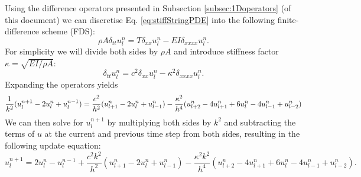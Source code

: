 \documentclass{article}
\begin{document}
Using the difference operators presented in Subsection \ref{subsec:1Doperators} (of this document) we can discretise Eq. \eqref{eq:stiffStringPDE} into the following finite-difference scheme (FDS):
\begin{equation}\label{eq:stiffStringFDS}
    \rho A \delta_{tt}u_l^n = T \delta_{xx} u_l^n - EI \delta_{xxxx} u_l^n.
\end{equation}
For simplicity we will divide both sides by $\rho A$ and introduce stiffness factor $\kappa = \sqrt{EI/\rho A}$:
\begin{equation}\label{eq:stiffStringFDSVars}
   \delta_{tt}u_l^n = c^2 \delta_{xx} u_l^n - \kappa^2 \delta_{xxxx} u_l^n.
\end{equation}
Expanding the operators yields
\begin{equation}
    \frac{1}{k^2}(u_l^{n+1}-2u_l^n+u_l^{n-1}) = \frac{c^2}{h^2}(u_{l+1}^n-2u_l^n+u_{l-1}^n)- \\
 \frac{\kappa^2}{h^4}(u_{l+2}^n-4u_{l+1}^n+6u_l^n-4u_{l-1}^n+u_{l-2}^n)
\end{equation}
We can then solve for $u_l^{n+1}$ by multiplying both sides by $k^2$ and subtracting the terms of $u$ at the current and previous time step from both sides, resulting in the following update equation:
\begin{equation}
    u_l^{n+1} = 2u_l^n-u_l^{n-1}+\frac{c^2k^2}{h^2}(u_{l+1}^n-2u_l^n+u_{l-1}^n)-\frac{\kappa^2k^2}{h^4}(u_{l+2}^n-4u_{l+1}^n+6u_l^n-4u_{l-1}^n+u_{l-2}^n).
\end{equation}
\end{document}
